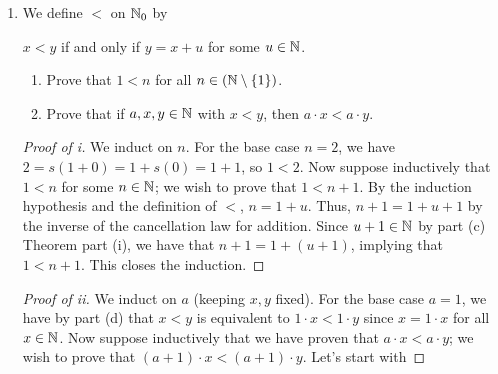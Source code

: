 \documentclass[../main.tex]{subfiles}
\begin{document}
\begin{enumerate}
\begin{enumerate}[label={(\alph*)}]
\begin{definition*}
\begin{align*}
                x\cdot 0 &= 0\\
                x\cdot s(y) &= x\cdot y+x
            \end{align*}
        \end{definition*}
        Prove that $x\cdot 1=x$ for all $x\in\N_0$.
        \begin{proof}
            Since $s(0)=1$,
            \begin{align*}
                x\cdot 1 &= x\cdot s(0)
                \intertext{By the definition of multiplication, the above is}
                &= x\cdot 0+x
                \intertext{From the above, we can use the definition of multiplication to substitute $x\cdot 0=0$.}
                &= 0+x
                \intertext{Now just apply part (ii) of the Theorem in part (c).}
                &= x
            \end{align*}
        \end{proof}
        \item \leavevmode\vspace{-1.6em}
        \begin{definition*}
            We define $<$ on $\mathbb{N}_0$ by
            \begin{center}
                $x<y$ if and only if $y=x+u$ for some $u\in\mathbb{N}$.
            \end{center}
        \end{definition*}
        \begin{enumerate}
            \item Prove that $1<n$ for all $n\in(\mathbb{N}\setminus\{1\})$.
            \item Prove that if $a,x,y\in\mathbb{N}$ with $x<y$, then $a\cdot x<a\cdot y$.
        \end{enumerate}
        \begin{proof}[Proof of i]
            We induct on $n$. For the base case $n=2$, we have $2=s(1+0)=1+s(0)=1+1$, so $1<2$. Now suppose inductively that $1<n$ for some $n\in\mathbb{N}$; we wish to prove that $1<n+1$. By the induction hypothesis and the definition of $<$, $n=1+u$. Thus, $n+1=1+u+1$ by the inverse of the cancellation law for addition. Since $u+1\in\mathbb{N}$ by part (c) Theorem part (i), we have that $n+1=1+(u+1)$, implying that $1<n+1$. This closes the induction.
        \end{proof}
        \begin{proof}[Proof of ii]
            We induct on $a$ (keeping $x,y$ fixed). For the base case $a=1$, we have by part (d) that $x<y$ is equivalent to $1\cdot x<1\cdot y$ since $x=1\cdot x$ for all $x\in\mathbb{N}$. Now suppose inductively that we have proven that $a\cdot x<a\cdot y$; we wish to prove that $(a+1)\cdot x<(a+1)\cdot y$. Let's start with

\end{proof}
\end{enumerate}
\end{enumerate}
\end{document}
